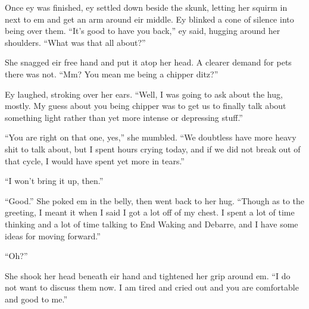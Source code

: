 Once ey was finished, ey settled down beside the skunk, letting her squirm in next to em and get an arm around eir middle. Ey blinked a cone of silence into being over them. ``It's good to have you back,'' ey said, hugging around her shoulders. ``What was that all about?''

She snagged eir free hand and put it atop her head. A clearer demand for pets there was not. ``Mm? You mean me being a chipper ditz?''

Ey laughed, stroking over her ears. ``Well, I was going to ask about the hug, mostly. My guess about you being chipper was to get us to finally talk about something light rather than yet more intense or depressing stuff.''

``You are right on that one, yes,'' she mumbled. ``We doubtless have more heavy shit to talk about, but I spent hours crying today, and if we did not break out of that cycle, I would have spent yet more in tears.''

``I won't bring it up, then.''

``Good.'' She poked em in the belly, then went back to her hug. ``Though as to the greeting, I meant it when I said I got a lot off of my chest. I spent a lot of time thinking and a lot of time talking to End Waking and Debarre, and I have some ideas for moving forward.''

``Oh?''

She shook her head beneath eir hand and tightened her grip around em. ``I do not want to discuss them now. I am tired and cried out and you are comfortable and good to me.''
